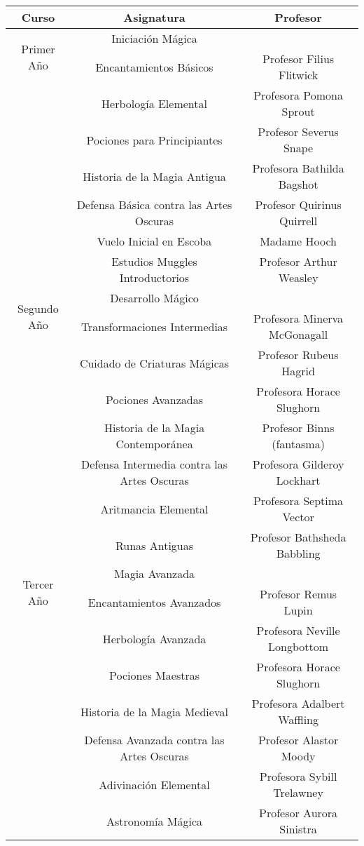 \begin{table}[H]
  \centering
  \begin{tabular}{c|c|c}
  \textbf{Curso} & \textbf{Asignatura} & \textbf{Profesor} \\ \hline
  \multirow{2}{*}{Primer Año} & Iniciación Mágica & \\
  & Encantamientos Básicos & Profesor Filius Flitwick \\
  & Herbología Elemental & Profesora Pomona Sprout \\
  & Pociones para Principiantes & Profesor Severus Snape \\
  & Historia de la Magia Antigua & Profesora Bathilda Bagshot \\
  & Defensa Básica contra las Artes Oscuras & Profesor Quirinus Quirrell \\
  & Vuelo Inicial en Escoba & Madame Hooch \\
  & Estudios Muggles Introductorios & Profesor Arthur Weasley \\ \hline
  \multirow{2}{*}{Segundo Año} & Desarrollo Mágico & \\
  & Transformaciones Intermedias & Profesora Minerva McGonagall \\
  & Cuidado de Criaturas Mágicas & Profesor Rubeus Hagrid \\
  & Pociones Avanzadas & Profesora Horace Slughorn \\
  & Historia de la Magia Contemporánea & Profesor Binns (fantasma) \\
  & Defensa Intermedia contra las Artes Oscuras & Profesora Gilderoy Lockhart \\
  & Aritmancia Elemental & Profesora Septima Vector \\
  & Runas Antiguas & Profesor Bathsheda Babbling \\ \hline
  \multirow{2}{*}{Tercer Año} & Magia Avanzada & \\
  & Encantamientos Avanzados & Profesor Remus Lupin \\
  & Herbología Avanzada & Profesora Neville Longbottom \\
  & Pociones Maestras & Profesora Horace Slughorn \\
  & Historia de la Magia Medieval & Profesora Adalbert Waffling \\
  & Defensa Avanzada contra las Artes Oscuras & Profesor Alastor Moody \\
  & Adivinación Elemental & Profesora Sybill Trelawney \\
  & Astronomía Mágica & Profesor Aurora Sinistra \\ \hline

\end{tabular}
\end{table}

